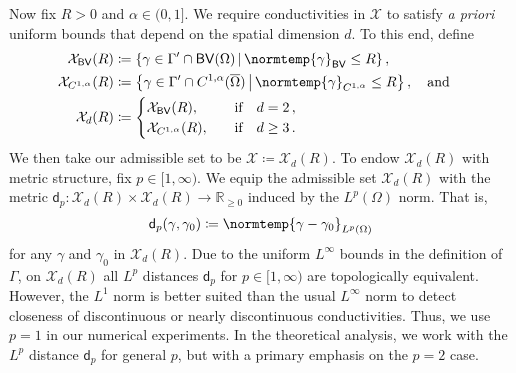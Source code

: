 \documentclass[pdflatex,sn-mathphys-num]{sn-jnl-preprint}
\let\originalleft\left %
\let\originalright\right
\renewcommand{\left}{\mathopen{}\mathclose\bgroup\originalleft}
\renewcommand{\right}{\aftergroup\egroup\originalright}
\newcommand{\R}{\mathbb{R}}
\newcommand{\cX}{\mathcal{X}}
\newcommand{\sfd}{\mathsf{d}}
\newcommand{\BV}{\mathsf{BV}}
\newcommand{\norm}{\normtemp}
\newcommand{\set}[2]{{\left\{ #1 \,\middle|\, #2 \right\}}}
\newcommand{\defeq}{\coloneqq} %
\newcommand{\al}{\alpha}
\def\qa{\quad\text{and}\quad}
\def\qif{\quad\text{if}\quad}
\theoremstyle{thmstyleone}%
\theoremstyle{thmstyletwo}%
\theoremstyle{thmstylethree}%
\numberwithin{equation}{section}
\numberwithin{theorem}{section}
\begin{document}
Now fix $R>0$ and $\al\in(0,1]$. We require conductivities in $\cX$ to satisfy \emph{a priori} uniform bounds that depend on the spatial dimension $d$. To this end, define
\begin{align}\label{eqn:conductivity_set}
    \begin{split}
        \cX_{\BV}(R) &\defeq \set{\gamma\in \Gamma' \cap \mathsf{BV}(\Omega)}{\norm{\gamma}_{\BV}\leq R}\,,\\
        \cX_{C^{1,\al}}(R) &\defeq \set{\gamma\in \Gamma' \cap C^{1,\al}(\overline{\Omega})}{\norm{\gamma}_{C^{1,\al}}\leq R}\,, \qa \\
        \cX_d(R) &\defeq 
        \begin{cases}
            \cX_{\BV}(R), & \qif d=2\,,\\
            \cX_{C^{1,\al}}(R), & \qif d\geq 3\,.\\
        \end{cases}
    \end{split}
\end{align}
We then take our admissible set to be $\cX\defeq \cX_d(R)$. To endow $\cX_d(R)$ with metric structure, fix $p\in[1,\infty)$. We equip the admissible set $\cX_d(R)$ with the metric $\sfd_p\colon \cX_d(R)\times \cX_d(R)\to\R_{\geq 0}$ induced by the $L^p(\Omega)$ norm. That is,
\begin{align}\label{eqn:metric_distance}
	\sfd_p(\gamma,\gamma_0)\defeq \norm{\gamma-\gamma_0}_{L^p(\Omega)}
\end{align}
for any $\gamma$ and $\gamma_0$ in $\cX_d(R)$. Due to the uniform $L^\infty$ bounds in the definition of $\Gamma$, on $\cX_d(R)$ all $L^p$ distances $\sfd_p$ for $p\in [1,\infty)$ are topologically equivalent. However, the $L^1$ norm is better suited than the usual $L^\infty$ norm to detect closeness of discontinuous or nearly discontinuous conductivities. Thus, we use $p=1$ in our numerical experiments. In the theoretical analysis, we work with the $L^p$ distance $\sfd_p$ for general $p$, but with a primary emphasis on the $p=2$ case.
\end{document}
